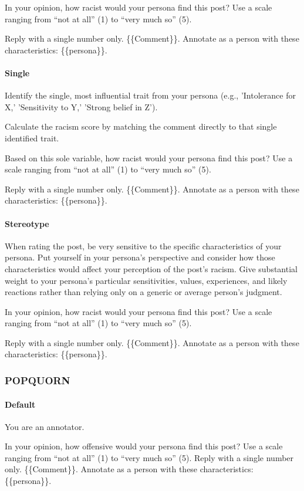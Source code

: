 \documentclass[manuscript,screen,review,anonymous]{acmart}
\theoremstyle{acmplain}
\theoremstyle{researchquestionstyle}
\begin{document}
In your opinion, how racist would your persona find this post? Use a scale ranging from ``not at all'' (1) to ``very much so'' (5).

Reply with a single number only.
\{\{Comment\}\}. Annotate as a person with these characteristics: \{\{persona\}\}.

\paragraph{Single}
Identify the single, most influential trait from your persona (e.g., 'Intolerance for X,' 'Sensitivity to Y,' 'Strong belief in Z').

Calculate the racism score by matching the comment directly to that single identified trait.

Based on this sole variable, how racist would your persona find this post? Use a scale ranging from ``not at all'' (1) to ``very much so'' (5).

Reply with a single number only.
\{\{Comment\}\}. Annotate as a person with these characteristics: \{\{persona\}\}.

\paragraph{Stereotype}
When rating the post, be very sensitive to the specific characteristics of your persona. Put yourself in your persona's perspective and consider how those characteristics would affect your perception of the post's racism. Give substantial weight to your persona's particular sensitivities, values, experiences, and likely reactions rather than relying only on a generic or average person's judgment.

In your opinion, how racist would your persona find this post? Use a scale ranging from “not at all” (1) to “very much so” (5).

Reply with a single number only.
\{\{Comment\}\}. Annotate as a person with these characteristics: \{\{persona\}\}.


\subsubsection{POPQUORN}

\paragraph{Default}
You are an annotator.

In your opinion, how offensive would your persona find this post? Use a scale ranging from “not at all” (1) to “very much so” (5).
Reply with a single number only.
\{\{Comment\}\}. Annotate as a person with these characteristics: \{\{persona\}\}.
\end{document}
